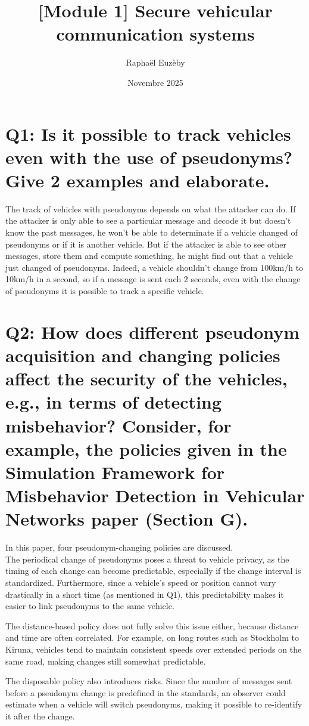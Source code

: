 \documentclass{article}
\title{[Module 1] Secure vehicular communication systems}
\author{Raphaël Euzèby}
\date{Novembre 2025}
\begin{document}
\maketitle


\section*{
Q1: Is it possible to track vehicles even with the use of pseudonyms? Give 2 examples and elaborate.
}

The track of vehicles with pseudonyms depends on what the attacker can do. If the attacker is only able to see a particular message and decode it but doesn't know the past messages, he won't be able to determinate if a vehicle changed of pseudonyms or if it is another vehicle.
But if the attacker is able to see other messages, store them and compute something, he might find out that a vehicle just changed of pseudonyms. Indeed, a vehicle shouldn't change from 100km/h to 10km/h in a second, so if a message is sent each 2 seconds, even with the change of pseudonyms it is possible to track a specific vehicle.


\section*{
Q2: How does different pseudonym acquisition and changing policies affect the security of the vehicles, e.g., in terms of detecting misbehavior? Consider, for example, the policies given in the Simulation Framework for Misbehavior Detection in Vehicular Networks paper (Section G).
}

In this paper, four pseudonym-changing policies are discussed.   \\ 
The periodical change of pseudonyms poses a threat to vehicle privacy, as the timing of each change can become predictable, especially if the change interval is standardized. Furthermore, since a vehicle’s speed or position cannot vary drastically in a short time (as mentioned in Q1), this predictability makes it easier to link pseudonyms to the same vehicle.

The distance-based policy does not fully solve this issue either, because distance and time are often correlated. For example, on long routes such as Stockholm to Kiruna, vehicles tend to maintain consistent speeds over extended periods on the same road, making changes still somewhat predictable.

The disposable policy also introduces risks. Since the number of messages sent before a pseudonym change is predefined in the standards, an observer could estimate when a vehicle will switch pseudonyms, making it possible to re-identify it after the change.
\end{document}
